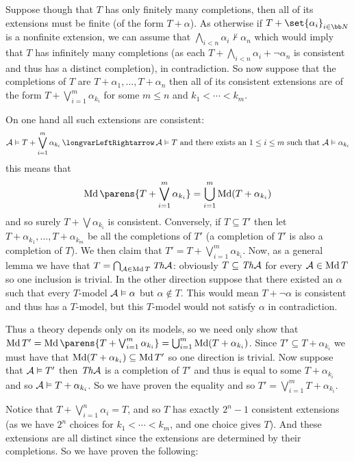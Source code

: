 Suppose though that $T$ has only finitely many completions, then all of its extensions must be finite (of the form $T+\alpha$).
As otherwise if $T+\set{\alpha_i}_{i\in{\bb N}}$ is a nonfinite extension, we can assume that $\bigwedge_{i<n}\alpha_i\nvdash\alpha_n$ which would imply that $T$ has infinitely many completions
(as each $T+\bigwedge_{i<n}\alpha_i+\neg\alpha_n$ is consistent and thus has a distinct completion), in contradiction.
So now suppose that the completions of $T$ are $T+\alpha_1,\dots,T+\alpha_n$ then all of its consistent extensions are of the form $T+\bigvee_{i=1}^m\alpha_{k_i}$ for some $m\leq n$ and $k_1<\cdots<k_m$.

On one hand all such extensions are consistent:
$$ {\cal A}\vDash T+\bigvee_{i=1}^m\alpha_{k_i} \iff {\cal A}\vDash T\hbox{ and there exists an $1\leq i\leq m$ such that }{\cal A}\vDash\alpha_{k_i} $$
this means that
$$ \Md\parens{T+\bigvee_{i=1}^m\alpha_{k_i}} = \bigcup_{i=1}^m\Md(T+\alpha_{k_i}) $$
and so surely $T+\bigvee\alpha_{k_i}$ is consistent.
Conversely, if $T\subseteq T'$ then let $T+\alpha_{k_1},\dots,T+\alpha_{k_m}$ be all the completions of $T'$ (a completion of $T'$ is also a completion of $T$).
We then claim that $T'=T+\bigvee_{i=1}^m\alpha_{k_i}$.
Now, as a general lemma we have that $T=\bigcap_{{\cal A}\in\mathop{\rm Md} T}{\it Th}{\cal A}$: obviously $T\subseteq{\it Th}{\cal A}$ for every ${\cal A}\in\mathop{\rm Md} T$ so one inclusion is trivial.
In the other direction suppose that there existed an $\alpha$ such that every $T$-model ${\cal A}\vDash\alpha$ but $\alpha\notin T$.
This would mean $T+\neg\alpha$ is consistent and thus has a $T$-model, but this $T$-model would not satisfy $\alpha$ in contradiction.

Thus a theory depends only on its models, so we need only show that $\Md T'=\Md\parens{T+\bigvee_{i=1}^m\alpha_{k_i}}=\bigcup_{i=1}^m\Md(T+\alpha_{k_i})$.
Since $T'\subseteq T+\alpha_{k_i}$ we must have that $\mathop{\rm Md}(T+\alpha_{k_i})\subseteq\mathop{\rm Md} T'$ so one direction is trivial.
Now suppose that ${\cal A}\vDash T'$ then ${\it Th}{\cal A}$ is a completion of $T'$ and thus is equal to some $T+\alpha_{k_i}$ and so ${\cal A}\vDash T+\alpha_{k_i}$.
So we have proven the equality and so $T'=\bigvee_{i=1}^m T+\alpha_{k_i}$.

Notice that $T+\bigvee_{i=1}^n\alpha_i=T$, and so $T$ has exactly $2^n-1$ consistent extensions (as we have $2^n$ choices for $k_1<\cdots<k_m$, and one choice gives $T$).
And these extensions are all distinct since the extensions are determined by their completions.
So we have proven the following:

